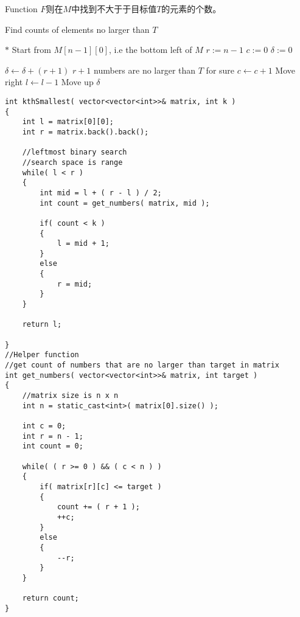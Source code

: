Function $F$则在$M$中找到不大于于目标值$T$的元素的个数。
\begin{algorithm}[H]
\caption{Find counts of elements no larger than $T$}
\begin{algorithmic}[1]
\State $\ast$ Start from $M[n-1][0]$, i.e the bottom left of $M$
\State $r:=n-1$
\State $c:=0$
\State $\delta:=0$
\end{algorithmic}
\end{algorithm}
\begin{algorithm}[H]
\begin{algorithmic}[1]
\State $\delta\gets \delta + (r+1)$ \Comment $r+1$ numbers are no larger than $T$ for sure
\State $c\gets c+1$ \Comment Move right
\Else
\State $l\gets l-1$ \Comment Move up
\EndIf
\EndWhile
\State \Return $\delta$
\EndProcedure
\end{algorithmic}
\end{algorithm}

\setcounter{lstlisting}{0}
\begin{lstlisting}[style=customc, caption={Binary Search}]
int kthSmallest( vector<vector<int>>& matrix, int k )
{
    int l = matrix[0][0];
    int r = matrix.back().back();

    //leftmost binary search
    //search space is range
    while( l < r )
    {
        int mid = l + ( r - l ) / 2;
        int count = get_numbers( matrix, mid );

        if( count < k )
        {
            l = mid + 1;
        }
        else
        {
            r = mid;
        }
    }

    return l;

}
//Helper function
//get count of numbers that are no larger than target in matrix
int get_numbers( vector<vector<int>>& matrix, int target )
{
    //matrix size is n x n
    int n = static_cast<int>( matrix[0].size() );

    int c = 0;
    int r = n - 1;
    int count = 0;

    while( ( r >= 0 ) && ( c < n ) )
    {
        if( matrix[r][c] <= target )
        {
            count += ( r + 1 );
            ++c;
        }
        else
        {
            --r;
        }
    }

    return count;
}
\end{lstlisting}